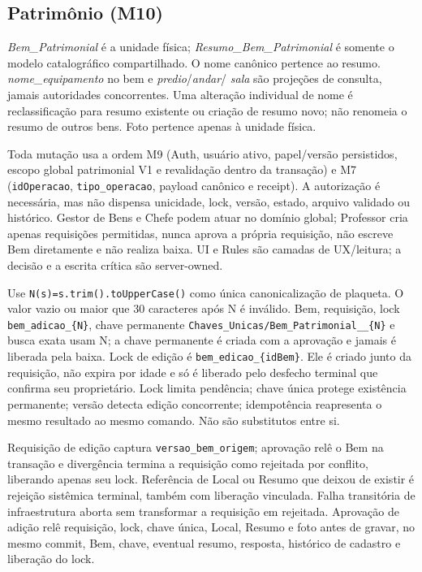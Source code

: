 \subsection{Patrimônio (M10)}
\label{sec:regras-patrimonio-m10}

\begin{regra}
\textit{Bem\_Patrimonial} é a unidade física; \textit{Resumo\_Bem\_Patrimonial}
é somente o modelo catalográfico compartilhado. O nome canônico pertence ao
resumo. \textit{nome\_equipamento} no bem e \textit{predio}/\textit{andar}/
\textit{sala} são projeções de consulta, jamais autoridades concorrentes. Uma
alteração individual de nome é reclassificação para resumo existente ou criação
de resumo novo; não renomeia o resumo de outros bens. Foto pertence apenas à
unidade física.

Toda mutação usa a ordem M9 (Auth, usuário ativo, papel/versão persistidos,
escopo global patrimonial V1 e revalidação dentro da transação) e M7
(\texttt{idOperacao}, \texttt{tipo\_operacao}, payload canônico e receipt). A
autorização é necessária, mas não dispensa unicidade, lock, versão, estado,
arquivo validado ou histórico. Gestor de Bens e Chefe podem atuar no domínio
global; Professor cria apenas requisições permitidas, nunca aprova a própria
requisição, não escreve Bem diretamente e não realiza baixa. UI e Rules são
camadas de UX/leitura; a decisão e a escrita crítica são server-owned.
\end{regra}

\begin{regra}
Use \texttt{N(s)=s.trim().toUpperCase()} como única canonicalização de plaqueta.
O valor vazio ou maior que 30 caracteres após N é inválido. Bem, requisição,
lock \texttt{bem\_adicao\_\{N\}}, chave permanente
\texttt{Chaves\_Unicas/Bem\_Patrimonial\_\_\{N\}} e busca exata usam N; a
chave permanente é criada com a aprovação e jamais é liberada pela baixa.
Lock de edição é \texttt{bem\_edicao\_\{idBem\}}. Ele é criado junto da
requisição, não expira por idade e só é liberado pelo desfecho terminal que
confirma seu proprietário. Lock limita pendência; chave única protege existência
permanente; versão detecta edição concorrente; idempotência reapresenta o mesmo
resultado ao mesmo comando. Não são substitutos entre si.

Requisição de edição captura \texttt{versao\_bem\_origem}; aprovação relê o Bem
na transação e divergência termina a requisição como rejeitada por conflito,
liberando apenas seu lock. Referência de Local ou Resumo que deixou de existir é
rejeição sistêmica terminal, também com liberação vinculada. Falha transitória de
infraestrutura aborta sem transformar a requisição em rejeitada. Aprovação de
adição relê requisição, lock, chave única, Local, Resumo e foto antes de gravar,
no mesmo commit, Bem, chave, eventual resumo, resposta, histórico de cadastro e
liberação do lock.
\end{regra}


